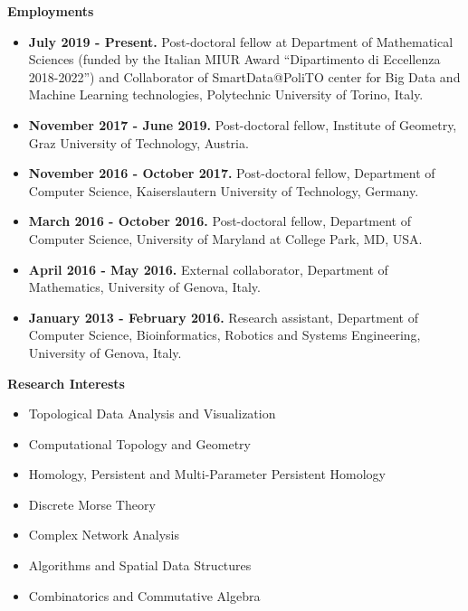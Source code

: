 \documentclass[11pt]{article}
\begin{document}
\vspace*{2.5ex}

\noindent
{\Large\bf Employments}

\begin{itemize}

\item {\bf July 2019 - Present.} Post-doctoral fellow at Department of Mathematical Sciences (funded by the Italian MIUR Award ``Dipartimento di Eccellenza 2018-2022'') and Collaborator of SmartData@PoliTO center for Big Data and Machine Learning technologies, Polytechnic University of Torino, Italy.

\item {\bf November 2017 - June 2019.} Post-doctoral fellow, Institute of Geometry, Graz University of Technology, Austria.

\item {\bf November 2016 - October 2017.} Post-doctoral fellow, Department of Computer Science, Kaiserslautern University of Technology, Germany.


\item {\bf March 2016 - October 2016.} Post-doctoral fellow, Department of Computer Science, University of Maryland at College Park, MD, USA.

\item {\bf April 2016 - May 2016.} External collaborator, Department of Mathematics, University of Genova, Italy.

\item {\bf January 2013 - February 2016.} Research assistant, Department of Computer Science, Bioinformatics, Robotics and Systems Engineering, University of Genova, Italy.

\end{itemize}



\vspace*{3ex}

\noindent
{\Large\bf Research Interests}

\begin{itemize}

\item Topological Data Analysis and Visualization
\item Computational Topology and Geometry
\item Homology, Persistent and Multi-Parameter Persistent Homology
\item Discrete Morse Theory
\item Complex Network Analysis
\item Algorithms and Spatial Data Structures
\item Combinatorics and Commutative Algebra

\end {itemize}
\end{document}
